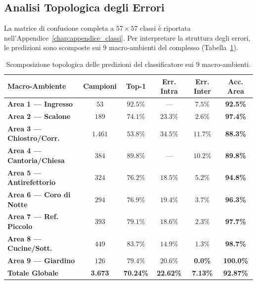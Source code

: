 \subsection{Analisi Topologica degli Errori}
La matrice di confusione completa a $57 \times 57$ classi è riportata nell'Appendice~\ref{chap:appendice_classi}. Per interpretare la struttura degli errori, le predizioni sono scomposte sui 9 macro-ambienti del complesso (Tabella~\ref{tab:scomposizione_errori}).

\begin{table}[htbp]
\centering
\footnotesize
\setlength{\tabcolsep}{3.5pt}
\begin{tabular*}{\textwidth}{@{\extracolsep{\fill}}lccccc}
\toprule
\textbf{Macro-Ambiente} & \textbf{Campioni} & \textbf{Top-1} & \textbf{Err. Intra} & \textbf{Err. Inter} & \textbf{Acc. Area} \\
\midrule
\textbf{Area 1 — Ingresso} & $53$ & $92.5\%$ & — & $7.5\%$ & \textbf{92.5\%} \\
\textbf{Area 2 — Scalone} & $189$ & $74.1\%$ & $23.3\%$ & $2.6\%$ & \textbf{97.4\%} \\
\textbf{Area 3 — Chiostro/Corr.} & $1.461$ & $53.8\%$ & $34.5\%$ & $11.7\%$ & \textbf{88.3\%} \\
\textbf{Area 4 — Cantoria/Chiesa} & $384$ & $89.8\%$ & — & $10.2\%$ & \textbf{89.8\%} \\
\textbf{Area 5 — Antirefettorio} & $324$ & $76.2\%$ & $18.5\%$ & $5.2\%$ & \textbf{94.8\%} \\
\textbf{Area 6 — Coro di Notte} & $294$ & $76.9\%$ & $19.4\%$ & $3.7\%$ & \textbf{96.3\%} \\
\textbf{Area 7 — Ref. Piccolo} & $393$ & $79.1\%$ & $18.6\%$ & $2.3\%$ & \textbf{97.7\%} \\
\textbf{Area 8 — Cucine/Sott.} & $449$ & $83.7\%$ & $14.9\%$ & $1.3\%$ & \textbf{98.7\%} \\
\textbf{Area 9 — Giardino} & $126$ & $79.4\%$ & $20.6\%$ & \textbf{0.0\%} & \textbf{100.0\%} \\
\midrule
\textbf{Totale Globale} & \textbf{3.673} & \textbf{70.24\%} & \textbf{22.62\%} & \textbf{7.13\%} & \textbf{92.87\%} \\
\bottomrule
\end{tabular*}
\caption{Scomposizione topologica delle predizioni del classificatore sui 9 macro-ambienti.}
\label{tab:scomposizione_errori}
\end{table}

